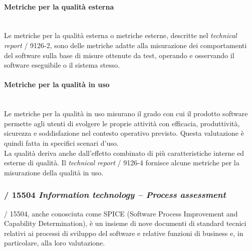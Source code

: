   \paragraph{Metriche per la qualità esterna}\\
    Le metriche per la qualità esterna o metriche esterne, descritte nel \emph{technical report} / 9126-2,
    sono delle metriche adatte alla misurazione dei comportamenti del software sulla base di misure ottenute da test, operando e osservando il software eseguibile o il sistema stesso.\\

  \paragraph{Metriche per la qualità in uso}\\
    Le metriche per la qualità in uso misurano il grado con cui il prodotto software permette agli utenti di svolgere le proprie attività con efficacia, produttività, sicurezza e soddisfazione nel contesto operativo previsto.
    Questa valutazione è quindi fatta in specifici scenari d'uso.\\
    La qualità deriva anche dall'effetto combinato di più caratteristiche interne ed esterne di qualità.
    Il \emph{technical report} / 9126-4 fornisce alcune metriche per la misurazione della qualità in uso.\\


  \subsubsection{/ 15504 \emph{Information technology – Process assessment}}

  / 15504, anche conosciuta come SPICE (Software Process Improvement and Capability Determination),
  è un insieme di nove documenti di standard tecnici relativi ai processi di sviluppo del software e relative funzioni di business e, in particolare, alla loro valutazione.

